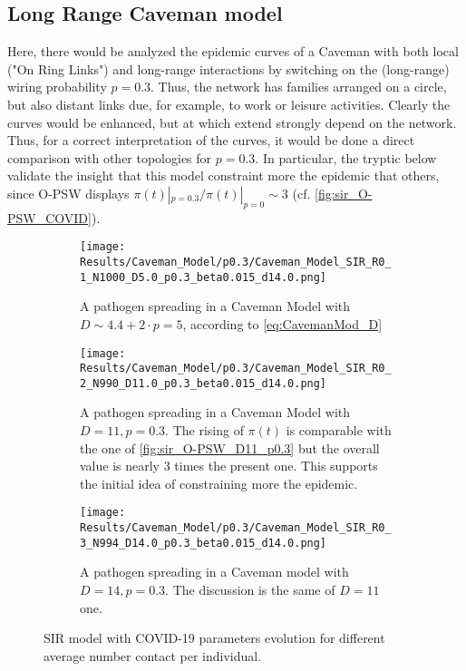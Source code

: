 \documentclass[a4paper,10pt,twoside]{book} %
\theoremstyle{definition}
\begin{document}
\subsection*{Long Range Caveman model}
Here, there would be analyzed the epidemic curves of a Caveman with both local ("On Ring Links") and long-range interactions by switching on the (long-range) wiring probability $p = 0.3$. Thus, the network has families arranged on a circle, but also distant links due, for example, to work or leisure activities.
Clearly the curves would be enhanced, but at which extend strongly depend on the network. Thus, for a correct interpretation of the curves, it would be done a direct comparison with other topologies for $p = 0.3$. In particular, the tryptic below validate the insight that this model constraint more the epidemic that others, since O-PSW displays $\pi(t)|_{p = 0.3} / \pi(t)|_{p=0}\sim 3$ (cf. \autoref{fig:sir_O-PSW_COVID}).
\begin{figure}[H]
	\centering
	\begin{subfigure}{0.9\linewidth}
		\texttt{[image: Results/Caveman\_Model/p0.3/Caveman\_Model\_SIR\_R0\_1\_N1000\_D5.0\_p0.3\_beta0.015\_d14.0.png]}
		\caption{A pathogen spreading in a Caveman Model with $D \sim 4.4+ 2\cdot p = 5$, according to \autoref{eq:CavemanMod_D}}
		\label{fig:sir_CM_D4_OR1_p0.3}
	\end{subfigure}
	\par\smallskip
	\begin{subfigure}{0.9\linewidth}
		\texttt{[image: Results/Caveman\_Model/p0.3/Caveman\_Model\_SIR\_R0\_2\_N990\_D11.0\_p0.3\_beta0.015\_d14.0.png]}
		\caption{A pathogen spreading in a Caveman Model with $D = 11, p = 0.3$. The rising of $\pi(t)$ is comparable with the one of \autoref{fig:sir_O-PSW_D11_p0.3} but the overall value is nearly $3$ times the present one. This supports the initial idea of constraining more the epidemic.}
		\label{fig:sir_CM_D11_p0.3}
	\end{subfigure}
	\par\smallskip
	\begin{subfigure}{0.9\linewidth}
		\texttt{[image: Results/Caveman\_Model/p0.3/Caveman\_Model\_SIR\_R0\_3\_N994\_D14.0\_p0.3\_beta0.015\_d14.0.png]}
		\caption{A pathogen spreading in a Caveman model with $D = 14, p = 0.3$. The discussion is the same of $D = 11$ one.}
		\label{fig:sir_CM_D13_p0.3}
	\end{subfigure}
	\caption{SIR model with COVID-19 parameters evolution for different average number contact per individual.}
	\label{fig:sir_CM_COVID_p0.3}
\end{figure}
\end{document}
